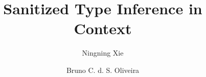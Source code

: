 \documentclass[oribibl]{llncs}
\begin{document}
\title{Sanitized Type Inference in Context}

\author{Ningning Xie \and Bruno C. d. S. Oliveira}

\maketitle







% 
% 
% 

% 

\appendix

% 
\end{document}
